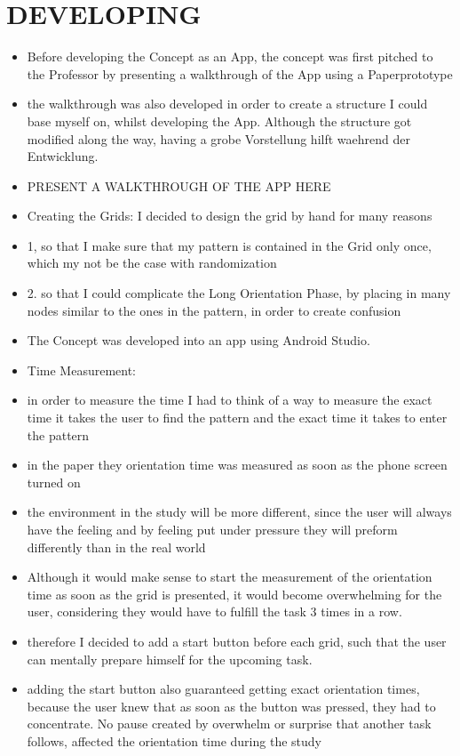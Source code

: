 \section {DEVELOPING}
\begin{itemize}
\item Before developing the Concept as an App, the concept was first pitched to the Professor by presenting a walkthrough of the App using a Paperprototype
\item the walkthrough was also developed in order to create a structure I could base myself on, whilst developing the App. Although the structure got modified along the way, having a grobe Vorstellung hilft waehrend der Entwicklung.
\item PRESENT A WALKTHROUGH OF THE APP HERE 
\item Creating the Grids: I decided to design the grid by hand for many reasons 
\item 1, so that I make sure that my pattern is contained in the Grid only once, which my not be the case with randomization
\item 2. so that I could complicate the Long Orientation Phase, by placing in many nodes similar to the ones in the pattern, in order to create confusion
\item The Concept was developed into an app using Android Studio. 
\item Time Measurement: 
\item in order to measure the time I had to think of a way to measure the exact time it takes the user to find the pattern and the exact time it takes to enter the pattern 
\item in the paper they orientation time was measured as soon as the phone screen turned on
\item the environment in the study will be more different, since the user will always have the feeling and by feeling put under pressure they will preform differently than in the real world
\item Although it would make sense to start the measurement of the orientation time as soon as the grid is presented, it would become overwhelming for the user, considering they would have to fulfill the task 3 times in a row. 
\item therefore I decided to add a start button before each grid, such that the user can mentally prepare himself for the upcoming task. 
\item adding the start button also guaranteed getting exact orientation times, because the user knew that as soon as the button was pressed, they had to concentrate. No pause created by overwhelm or surprise that another task follows, affected the orientation time during the study

\end{itemize}
